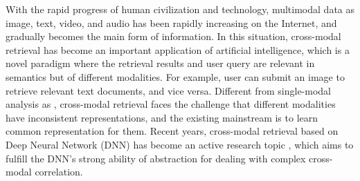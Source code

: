 \documentclass{article}
\begin{document}
With the rapid progress of human civilization and technology, multimodal data as image, text, video, and audio has been rapidly increasing on the Internet, and gradually becomes the main form of information. In this situation, cross-modal retrieval has become an important application of artificial intelligence, which is a novel paradigm where the retrieval results and user query are relevant in semantics but of different modalities. For example, user can submit an image to retrieve relevant text documents, and vice versa. %
Different from single-modal analysis as \cite{DBLP:conf/aaai/Peng15,DBLP:journals/tip/TangLWZ15}, cross-modal retrieval faces the challenge that 
 different modalities have inconsistent representations, and the existing mainstream is to learn common representation for them.
Recent years, cross-modal retrieval based on Deep Neural Network (DNN) has become an active research topic \cite{ngiam32011multimodal,srivastava2012learning,feng12014cross,DBLP:conf/ijcai/PengHQ16}, which aims to fulfill the DNN's strong ability of abstraction for dealing with complex cross-modal correlation.
\end{document}
